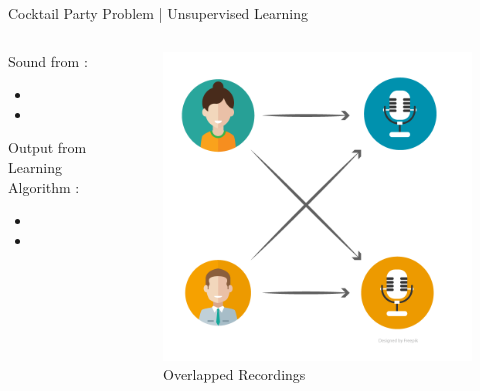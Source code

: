 \documentclass[10pt]{beamer}
\begin{document}
			\begin{frame}{Cocktail Party Problem | Unsupervised Learning}
				\begin{columns}
					\begin{column}{0.5\textwidth}
						Sound from :
						\begin{itemize}
							\item {}
							\item {}
						\end{itemize}
						\bigskip
						Output from Learning Algorithm :
						\begin{itemize}
							\item {}
							\item {}
						\end{itemize}
					\end{column}
					\begin{column}{0.5\textwidth}
						\begin{figure}
							\centering
							\includegraphics[width=1.0\linewidth]{images/cpp-repr}
							\caption{Overlapped Recordings}
						\end{figure}
					\end{column}
				\end{columns}
			\end{frame}
\end{document}
